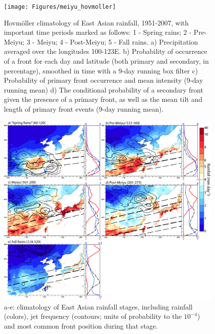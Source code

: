 \documentclass[draft,grl]{AGUTeX}
\begin{document}
\begin{figure}
\label{hov}
\noindent\texttt{[image: Figures/meiyu\_hovmoller]}
\caption{Hovm\"oller climatology of East Asian rainfall, 1951-2007, with important time periods marked as follows: 1 - Spring rains; 2 - Pre-Meiyu; 3 - Meiyu; 4 - Post-Meiyu; 5 - Fall rains. a) Precipitation averaged over the longitudes 100-123\textdegree E. b) Probability of occurrence of a front for each day and latitude (both primary and secondary, in percentage), smoothed in time with a 9-day running box filter c) Probability of primary front occurrence and mean intensity (9-day running mean) d) The conditional probability of a secondary front given the presence of a primary front, as well as the mean tilt and length of primary front events (9-day running mean).}
\end{figure}

\begin{figure}
\label{climo}
\noindent\includegraphics[width=36pc]{Figures/climo}
\caption{a-e: climatology of East Asian rainfall stages, including rainfall (colors), jet frequency (contours; units of probability to the $10^{-4}$) and most common front position during that stage.}
\end{figure}
\end{document}
